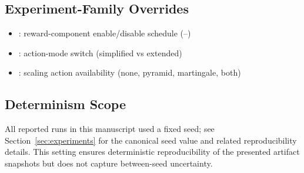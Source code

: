\subsection{Experiment-Family Overrides}
\begin{itemize}[leftmargin=1.4em]
	\item {}: reward-component enable/disable schedule (--)
	\item {}: action-mode switch (simplified vs extended)
	\item {}: scaling action availability (none, pyramid, martingale, both)
\end{itemize}

\subsection{Determinism Scope}
All reported runs in this manuscript used a fixed seed; see Section~\ref{sec:experiments} for the canonical seed value and related reproducibility details. This setting ensures deterministic reproducibility of the presented artifact snapshots but does not capture between-seed uncertainty.

